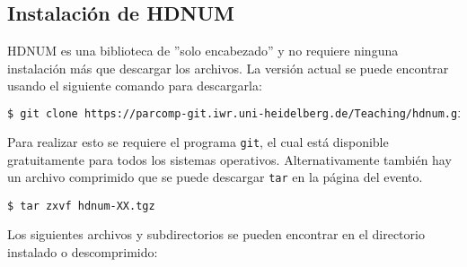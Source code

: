 \documentclass[a4paper,11pt]{article}
\theoremstyle{definition}
\begin{document}
\subsection{Instalación de HDNUM}

HDNUM es una biblioteca de ''solo encabezado'' y no requiere ninguna instalación más que descargar los archivos. La versión actual se puede encontrar usando el siguiente comando para descargarla:

\begin{lstlisting}[basicstyle=\ttfamily\footnotesize,language=bash,frame=single]
$ git clone https://parcomp-git.iwr.uni-heidelberg.de/Teaching/hdnum.git
\end{lstlisting}

Para realizar esto se requiere el programa \lstinline{git}, el cual está disponible gratuitamente para todos los sistemas operativos. Alternativamente también hay un archivo comprimido que se puede descargar \lstinline{tar} en la página del evento.
\begin{lstlisting}[basicstyle=\ttfamily\small,frame=single]
$ tar zxvf hdnum-XX.tgz
\end{lstlisting}
Los siguientes archivos y subdirectorios se pueden encontrar en el directorio instalado o descomprimido:
\end{document}

